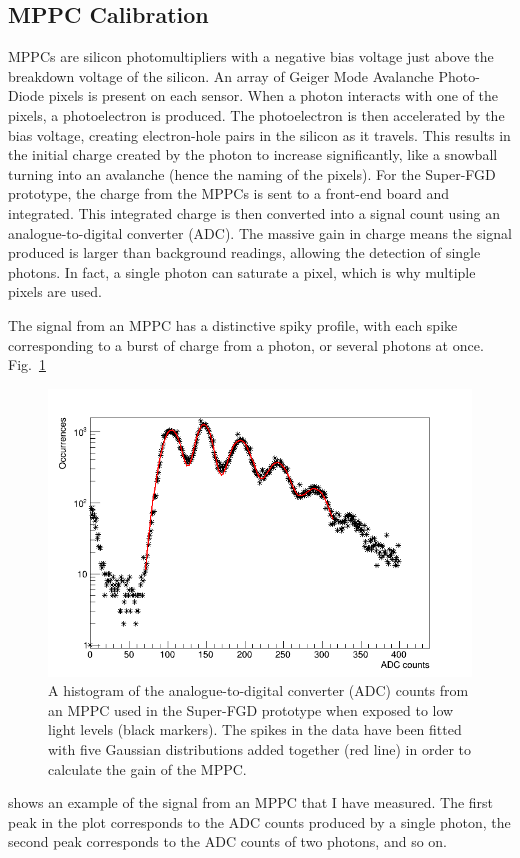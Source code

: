 \documentclass[aps,pra,12pt,notitlepage,tightenlines]{revtex4-1}
\begin{document}
\subsection{MPPC Calibration}
\label{sec:mppc}
MPPCs are silicon photomultipliers with a negative bias voltage just above the breakdown voltage of the silicon. An array of Geiger Mode Avalanche Photo-Diode pixels is present on each sensor. When a photon interacts with one of the pixels, a photoelectron is produced. The photoelectron is then accelerated by the bias voltage, creating electron-hole pairs in the silicon as it travels. This results in the initial charge created by the photon to increase significantly, like a snowball turning into an avalanche (hence the naming of the pixels). For the Super-FGD prototype, the charge from the MPPCs is sent to a front-end board and integrated. This integrated charge is then converted into a signal count using an analogue-to-digital converter (ADC). The massive gain in charge means the signal produced is larger than background readings, allowing the detection of single photons. In fact, a single photon can saturate a pixel, which is why multiple pixels are used.

The signal from an MPPC has a distinctive spiky profile, with each spike corresponding to a burst of charge from a photon, or several photons at once. Fig.\ \ref{fig:mppc}
\begin{figure}
 \includegraphics[scale=0.5]{MPPC}
 \caption{A histogram of the analogue-to-digital converter (ADC) counts from an MPPC used in the Super-FGD prototype when exposed to low light levels (black markers). The spikes in the data have been fitted with five Gaussian distributions added together (red line) in order to calculate the gain of the MPPC.}
 \label{fig:mppc}
\end{figure}
shows an example of the signal from an MPPC that I have measured. The first peak in the plot corresponds to the ADC counts produced by a single photon, the second peak corresponds to the ADC counts of two photons, and so on. 
 
\end{document}
